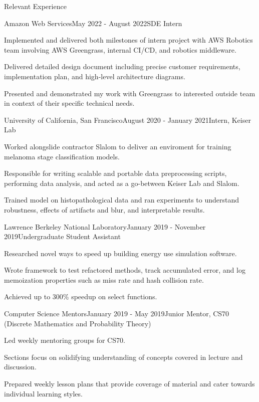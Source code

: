 \documentclass{resume}
\begin{document}
\begin{rSection}{Relevant Experience}

\begin{rSubsection}{Amazon Web Services}{May 2022 - August 2022}{SDE Intern}{}
\item Implemented and delivered both milestones of intern project with AWS Robotics team involving AWS Greengrass, internal CI/CD, and robotics middleware.
\item Delivered detailed design document including precise customer requirements, implementation plan, and high-level architecture diagrams.
\item Presented and demonstrated my work with Greengrass to interested outside team in context of their specific technical needs.
\end{rSubsection}

\begin{rSubsection}{University of California, San Francisco}{August 2020 - January 2021}{Intern, Keiser Lab}{}
\item Worked alongslide contractor Slalom to deliver an enviroment for training melanoma stage classification models. 
\item Responsible for writing scalable and portable data preprocessing scripts, performing data analysis, and acted as a go-between Keiser Lab and Slalom.
\item Trained model on histopathological data and ran experiments to understand robustness, effects of artifacts and blur, and interpretable results.
\end{rSubsection}

\begin{rSubsection}{Lawrence Berkeley National Laboratory}{January 2019 - November 2019}{Undergraduate Student Assistant}{}
\item Researched novel ways to speed up building energy use simulation software. 
\item Wrote framework 
to test refactored methods, track accumulated
error, and log memoization properties such as miss rate and hash collision rate. 
\item Achieved up to 300\% speedup on select functions. 
\end{rSubsection}



\begin{rSubsection}{Computer Science Mentors}{January 2019 - May 2019}{Junior Mentor, CS70 (Discrete Mathematics and Probability Theory)}{}
\item Led weekly mentoring groups for CS70. 
\item Sections focus on solidifying understanding of concepts covered in lecture and discussion. 
\item Prepared weekly lesson plans that provide coverage of material and cater towards individual learning
styles.
\end{rSubsection}


\end{rSection}
\end{document}
